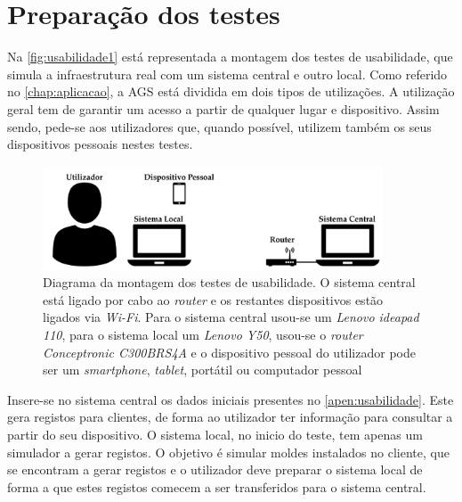 \documentclass[11pt,twoside,a4paper]{report}
\begin{document}
\section{Preparação dos testes}
Na \autoref{fig:usabilidade1} está representada a montagem dos testes de usabilidade, que simula a infraestrutura real com um sistema central e outro local. Como referido no \autoref{chap:aplicacao}, a AGS está dividida em dois tipos de utilizações. A utilização geral tem de garantir um acesso a partir de qualquer lugar e dispositivo. Assim sendo, pede-se aos utilizadores que, quando possível, utilizem também os seus dispositivos pessoais nestes testes.
\begin{figure}[H]
	\vspace{0.5cm}
	\begin{center}
		\includegraphics[width=0.9\textwidth]{montagem_testes} %
		\caption[Diagrama da montagem dos testes de usabilidade]{Diagrama da montagem dos testes de usabilidade. O sistema central está ligado por cabo ao \textit{router} e os restantes dispositivos estão ligados via \textit{Wi-Fi}. Para o sistema central usou-se um \textit{Lenovo ideapad 110}, para o sistema local um \textit{Lenovo Y50}, usou-se o \textit{router} \textit{Conceptronic C300BRS4A} e o dispositivo pessoal do utilizador pode ser um \textit{smartphone}, \textit{tablet}, portátil ou computador pessoal}
		\label{fig:usabilidade1}
	\end{center}
\end{figure}
Insere-se no sistema central os dados iniciais presentes no \autoref{apen:usabilidade}. Este gera registos para clientes, de forma ao utilizador ter informação para consultar a partir do seu dispositivo. O sistema local, no inicio do teste, tem apenas um simulador a gerar registos. O objetivo é simular moldes instalados no cliente, que se encontram a gerar registos e o utilizador deve preparar o sistema local de forma a que estes registos comecem a ser transferidos para o sistema central.
\end{document}
